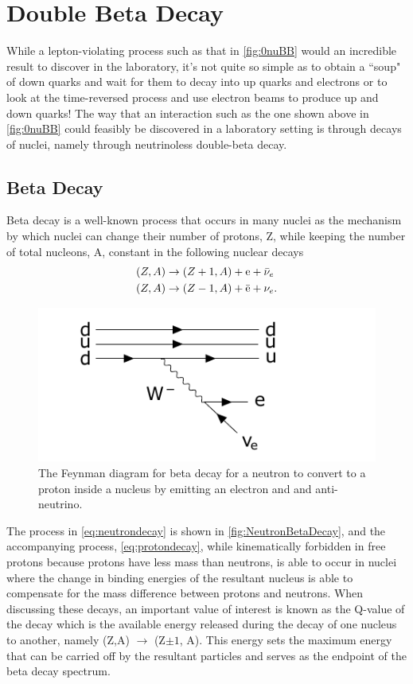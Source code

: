 \chapter{Double Beta Decay}
\label{chap:Beta Decay}

While a lepton-violating process such as that in \autoref{fig:0nuBB} would an incredible result to discover in the laboratory, it's not quite so simple as to obtain a ``soup" of down quarks and wait for them to decay into up quarks and electrons or to look at the time-reversed process and use electron beams to produce up and down quarks!
The way that an interaction such as the one shown above in \autoref{fig:0nuBB} could feasibly be discovered in a laboratory setting is through decays of nuclei, namely through neutrinoless double-beta decay. 
\section{Beta Decay}
\label{sec:Beta Decay}
Beta decay is a well-known process that occurs in many nuclei as the mechanism by which nuclei can change their number of protons, Z, while keeping the number of total nucleons, A, constant in the following nuclear decays
\begin{align}
    (Z, A) & \rightarrow (Z+1, A)+\textrm{e}+\Bar{\nu}_e \label{eq:neutrondecay} \\
    (Z, A) & \rightarrow (Z-1, A)+\Bar{\textrm{e}}+\nu_e. \label{eq:protondecay}
\end{align}
\begin{figure}[tbph]
    \centering
    \includegraphics[width=0.8\linewidth]{Figures/NeutronBetaDecay.pdf}
    \caption[Beta Decay Feynman diagram for a neutron converting to a proton.]
    {The Feynman diagram for beta decay for a neutron to convert to a proton inside a nucleus by emitting an electron and and anti-neutrino.}
    \label{fig:NeutronBetaDecay}
\end{figure}
The process in \autoref{eq:neutrondecay} is shown in \autoref{fig:NeutronBetaDecay}, and the accompanying process, \autoref{eq:protondecay}, while kinematically forbidden in free protons because protons have less mass than neutrons, is able to occur in nuclei where the change in binding energies of the resultant nucleus is able to compensate for the mass difference between protons and neutrons.
When discussing these decays, an important value of interest is known as the Q-value of the decay which is the available energy released during the decay of one nucleus to another, namely (Z,A) $\rightarrow$ (Z$\pm1$, A).
This energy sets the maximum energy that can be carried off by the resultant particles and serves as the endpoint of the beta decay spectrum. 

